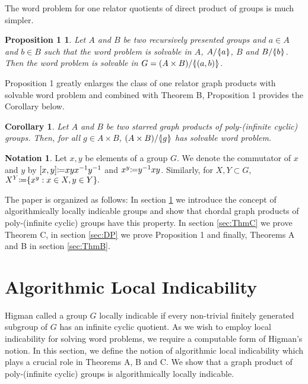 \documentclass[12pt, a4paper]{amsart}
\newtheorem*{ThmD}{Proposition 1}
\newtheorem{Cor}[Thm]{Corollary}
\theoremstyle{remark}
\theoremstyle{definition}
\newtheorem{Not}[Thm]{Notation}
\begin{document}
\noindent The word problem for one relator quotients of direct product of groups is much simpler.
\begin{ThmD} Let $A$ and $B$ be two recursively presented groups and $a\in A$ and $b\in B$ such that the word problem is solvable in $A$, $A/{{\langle}{\mkern-3.7mu}{\lvert}{\mkern1.2mu}{{a}}{\mkern1.2mu}{\rvert}{\mkern-3.7mu}{\rangle}}$, $B$ and $B/{{\langle}{\mkern-3.7mu}{\lvert}{\mkern1.2mu}{{b}}{\mkern1.2mu}{\rvert}{\mkern-3.7mu}{\rangle}}$. Then the word problem is solvable in  $G=(A \times B)/{{\langle}{\mkern-3.7mu}{\lvert}{\mkern1.2mu}{{(a,b)}}{\mkern1.2mu}{\rvert}{\mkern-3.7mu}{\rangle}}$. 
\end{ThmD} 

Proposition 1 greatly enlarges the class of one relator graph products with solvable word problem and combined with Theorem B, Proposition 1 provides the Corollary below. 
\begin{Cor}
Let $A$ and $B$ be two starred graph products of poly-(infinite cyclic) groups. Then, for all $g\in A\times B$, $(A\times B)/{{\langle}{\mkern-3.7mu}{\lvert}{\mkern1.2mu}{{g}}{\mkern1.2mu}{\rvert}{\mkern-3.7mu}{\rangle}}$ has solvable word problem.
\end{Cor}

\begin{Not}
Let $x,y$ be elements of a group $G$. We denote the commutator of $x$ and $y$ by  $[x,y]{\mathrel{\mathop\mathchar"303A}\mkern-1.2mu=} xyx^{-1}y^{-1}$ and $x^y{\mathrel{\mathop\mathchar"303A}\mkern-1.2mu=} y^{-1}xy$. Similarly, for $X,Y\subset G$,  $X^Y{\mathrel{\mathop\mathchar"303A}\mkern-1.2mu=} \{ x^y :x\in X, y\in Y\}.$
\end{Not}

The paper is organized as follows:
In section \ref{sec:ali} we introduce the concept of algorithmically locally indicable groups and show that chordal graph products of poly-(infinite cyclic) groups have this property. In section \ref{sec:ThmC} we prove Theorem C, in section \ref{sec:DP} we prove Proposition 1 and finally, Theorems A and B  in section  \ref{sec:ThmB}.

\section{Algorithmic Local Indicability}\label{sec:ali}
 
Higman called a group $G$ locally indicable if every non-trivial finitely generated subgroup of $G$ has an infinite cyclic quotient. As we wish to employ local indicability for solving word problems, we require a computable form of Higman's notion. In this section, we define the notion of algorithmic local indicability which plays a crucial role in Theorems A, B and C. We show that a graph product of poly-(infinite cyclic) groups is algorithmically locally indicable. 
\end{document}
